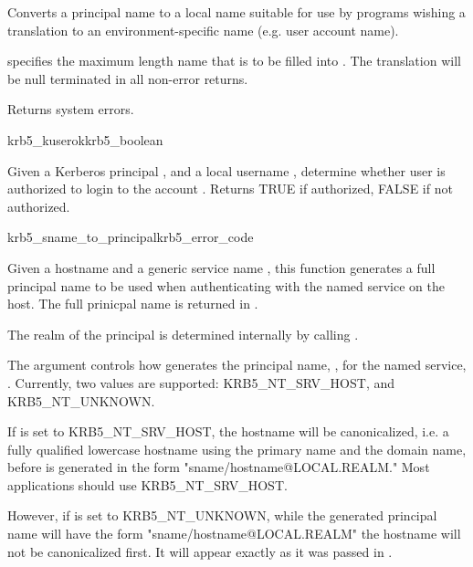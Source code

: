 Converts a principal name  to a local name suitable for use by
programs wishing a translation to an environment-specific name (e.g.
user account name).

 specifies the maximum length name that is to be filled into
.
The translation will be null terminated in all non-error returns.

Returns system errors.

\begin{funcdecl}{krb5_kuserok}{krb5_boolean}{\funcin}
\end{funcdecl}

Given a Kerberos principal , and a local username
,
determine whether user is authorized to login to the account .
Returns TRUE if authorized, FALSE if not authorized.

\begin{funcdecl}{krb5_sname_to_principal}{krb5_error_code}{\funcin}
\funcout
{}
\end{funcdecl}

Given a hostname  and a generic service name
, this function generates a full principal name to be
used when authenticating with the named service on the host.  The full
prinicpal name is  returned  in .

The realm of the
principal is determined internally by calling .

The  argument controls how
 generates the principal name,
, for the named service, .
Currently, two values 	are supported: KRB5_NT_SRV_HOST, and
KRB5_NT_UNKNOWN.  

If  is set to
KRB5_NT_SRV_HOST, the hostname will be
canonicalized, i.e. a fully qualified lowercase hostname using
the primary name and the domain name, before  is
generated in the form
"sname/hostname@LOCAL.REALM." Most applications should use
KRB5_NT_SRV_HOST.  

However, if  is set to KRB5_NT_UNKNOWN,
while the generated principal name will have 	the form
"sname/hostname@LOCAL.REALM" the hostname will not be canonicalized
first.  It will appear exactly as it was passed in .  

